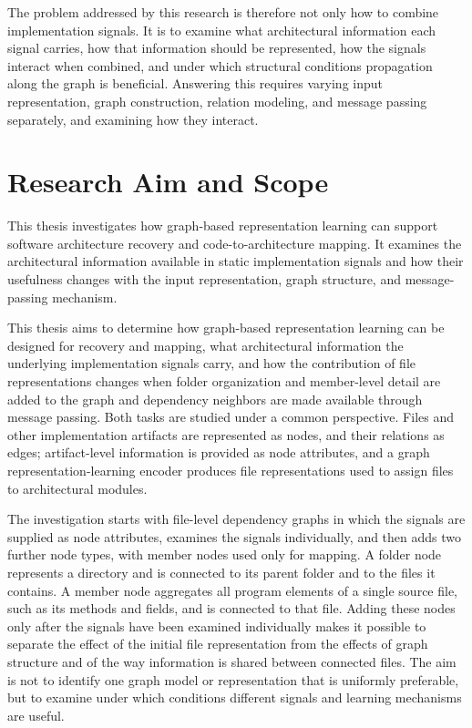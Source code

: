 The problem addressed by this research is therefore not only how to combine implementation signals. It is to examine what architectural information each signal carries, how that information should be represented, how the signals interact when combined, and under which structural conditions propagation along the graph is beneficial. Answering this requires varying input representation, graph construction, relation modeling, and message passing separately, and examining how they interact.

\section{Research Aim and Scope}
\label{sec:aim_scope}

This thesis investigates how graph-based representation learning can support software architecture recovery and code-to-architecture mapping. It examines the architectural information available in static implementation signals and how their usefulness changes with the input representation, graph structure, and message-passing mechanism.

This thesis aims to determine how graph-based representation learning can be designed for recovery and mapping, what architectural information the underlying implementation signals carry, and how the contribution of file representations changes when folder organization and member-level detail are added to the graph and dependency neighbors are made available through message passing. Both tasks are studied under a common perspective. Files and other implementation artifacts are represented as nodes, and their relations as edges; artifact-level information is provided as node attributes, and a graph representation-learning encoder produces file representations used to assign files to architectural modules.

The investigation starts with file-level dependency graphs in which the signals are supplied as node attributes, examines the signals individually, and then adds two further node types, with member nodes used only for mapping. A folder node represents a directory and is connected to its parent folder and to the files it contains. A member node aggregates all program elements of a single source file, such as its methods and fields, and is connected to that file. Adding these nodes only after the signals have been examined individually makes it possible to separate the effect of the initial file representation from the effects of graph structure and of the way information is shared between connected files. The aim is not to identify one graph model or representation that is uniformly preferable, but to examine under which conditions different signals and learning mechanisms are useful.

